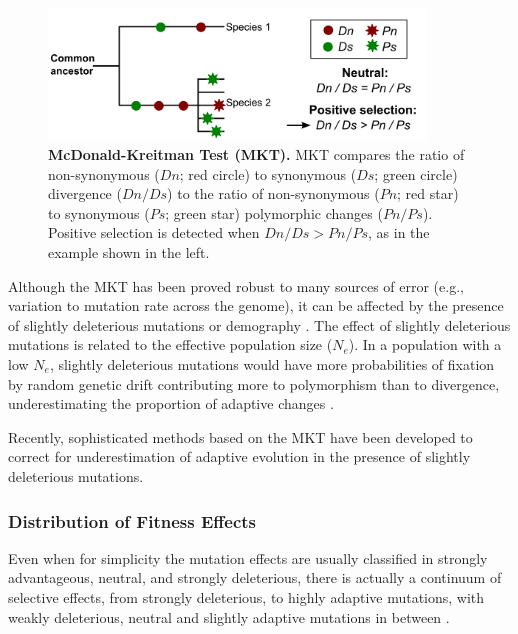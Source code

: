 \begin{figure}[h]
  \includegraphics[width=10cm]{./Images/MKT.png}
  \centering
  \caption{\textbf{McDonald-Kreitman Test (MKT).} MKT compares the ratio of non-synonymous ($Dn$; red circle) to synonymous ($Ds$; green circle) divergence ($Dn/Ds$) to the ratio of non-synonymous ($Pn$; red star) to synonymous ($Ps$; green star) polymorphic changes ($Pn/Ps$). Positive selection is detected when $Dn/Ds > Pn/Ps$, as in the example shown in the left.
   }
  \label{fig:MKT}
\end{figure}

Although the MKT has been proved robust to many sources of error (e.g., variation to mutation rate across the genome), it can be affected by the presence of slightly deleterious mutations or demography \citep{Messer2013,Eyre-Walker2006a}. 
%
The effect of slightly deleterious mutations is related to the effective population size ($N_{e}$). In a population with a low $N_{e}$, slightly deleterious mutations would have more probabilities of fixation by random genetic drift contributing more to polymorphism than to divergence, underestimating the proportion of adaptive changes \citep{Messer2013}.

Recently, sophisticated methods based on the MKT have been developed to correct for underestimation of adaptive evolution in the presence of slightly deleterious mutations. 


\subsubsection{Distribution of Fitness Effects}

Even when for simplicity the mutation effects are usually classified in strongly advantageous, neutral, and strongly deleterious, there is actually a continuum of selective effects, from strongly deleterious, 
to highly adaptive mutations, with weakly deleterious, neutral and slightly adaptive mutations in between \citep{Eyre-Walker2007}.


